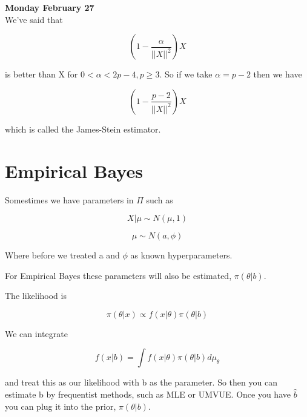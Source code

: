 \documentclass[11pt,fleqn]{book} %
\begin{document}
\textbf{Monday February 27}\\

We've said that

		$$(1 - \frac{\alpha}{||X||^2})X $$

is better than X for $0 < \alpha < 2p - 4, p \geq 3$. So if we take $\alpha = p - 2$ then we have

		$$(1 - \frac{p - 2}{||X||^2})X $$

which is called the James-Stein estimator. 

\section{Empirical Bayes}

Somestimes we have parameters in $\Pi$ such as 

		$$X|\mu \sim N(\mu, 1) $$

		$$\mu \sim N(a, \phi) $$

Where before we treated a and $\phi$ as known hyperparameters. 

For Empirical Bayes these parameters will also be estimated, $\pi(\theta|b)$.

The likelihood is 

		$$\pi(\theta|x) \propto f(x|\theta) \pi(\theta|b)$$

We can integrate

		$$f(x|b) = \int f(x|\theta)\pi(\theta|b) d\mu_\theta $$

and treat this as our likelihood with b as the parameter. So then you can estimate b by frequentist methods, such as MLE or UMVUE. Once you have $\hat{b}$ you can plug it into the prior, $\pi(\theta|b)$.   






\end{document}

